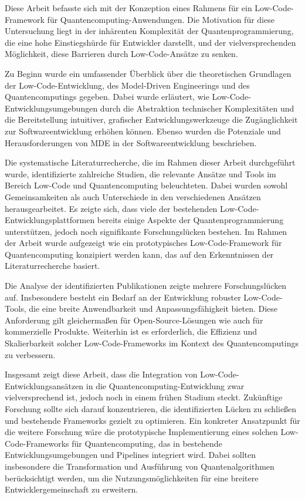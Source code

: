 Diese Arbeit befasste sich mit der Konzeption eines Rahmens für ein Low-Code-Framework für Quantencomputing-Anwendungen.
Die Motivation für diese Untersuchung liegt in der inhärenten Komplexität der Quantenprogrammierung, die eine 
hohe Einstiegshürde für Entwickler 
darstellt, und der vielversprechenden Möglichkeit, diese Barrieren durch Low-Code-Ansätze zu senken.

Zu Beginn wurde ein umfassender Überblick über die theoretischen Grundlagen der Low-Code-Entwicklung, des Model-Driven 
Engineerings und des Quantencomputings gegeben. Dabei wurde erläutert, wie Low-Code-Entwicklungsumgebungen durch die 
Abstraktion technischer Komplexitäten und die Bereitstellung intuitiver, grafischer Entwicklungswerkzeuge die Zugänglichkeit 
zur Softwareentwicklung erhöhen können. Ebenso wurden die Potenziale und Herausforderungen von MDE in der Softwareentwicklung beschrieben.

Die systematische Literaturrecherche, die im Rahmen dieser Arbeit durchgeführt wurde, identifizierte zahlreiche Studien, 
die relevante Ansätze und Tools im Bereich Low-Code und Quantencomputing beleuchteten. Dabei wurden sowohl Gemeinsamkeiten 
als auch Unterschiede in den verschiedenen Ansätzen herausgearbeitet. Es zeigte sich, dass viele der bestehenden 
Low-Code-Entwicklungsplattformen bereits einige Aspekte der Quantenprogrammierung unterstützen, jedoch noch signifikante 
Forschungslücken bestehen. Im Rahmen der Arbeit wurde aufgezeigt wie ein prototypisches Low-Code-Framework für Quantencomputing 
konzipiert werden kann, das auf den Erkenntnissen der 
Literaturrecherche basiert. 

Die Analyse der identifizierten Publikationen zeigte mehrere Forschungslücken auf. Insbesondere besteht ein Bedarf an der 
Entwicklung robuster Low-Code-Tools, die eine breite Anwendbarkeit und Anpassungsfähigkeit bieten. Diese Anforderung 
gilt gleichermaßen für Open-Source-Lösungen wie auch für kommerzielle Produkte. Weiterhin ist es erforderlich, die 
Effizienz und Skalierbarkeit solcher Low-Code-Frameworks im Kontext des Quantencomputings zu verbessern.

Insgesamt zeigt diese Arbeit, dass die Integration von Low-Code-Entwicklungsansätzen in die Quantencomputing-Entwicklung zwar 
vielversprechend ist, jedoch noch in einem frühen Stadium steckt. Zukünftige Forschung sollte sich darauf konzentrieren, die 
identifizierten Lücken zu schließen und bestehende Frameworks gezielt zu optimieren. Ein konkreter Ansatzpunkt für die weitere 
Forschung wäre die prototypische Implementierung eines solchen Low-Code-Frameworks für Quantencomputing, das in bestehende 
Entwicklungsumgebungen und Pipelines integriert wird. Dabei sollten insbesondere die Transformation und Ausführung von 
Quantenalgorithmen berücksichtigt werden, um die Nutzungsmöglichkeiten für eine breitere Entwicklergemeinschaft zu erweitern. 